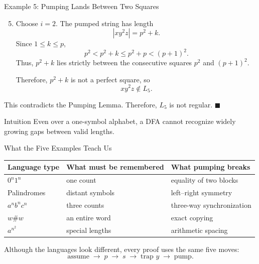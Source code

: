 \documentclass[10pt,aspectratio=169]{beamer}
\begin{document}
\begin{frame}{Example 5: Pumping Lands Between Two Squares}

\small
\begin{enumerate}
    \setcounter{enumi}{4}
    \item Choose $i=2$. The pumped string has length
    \[
    |xy^2z|=p^2+k.
    \]
    Since $1\leq k\leq p$,
    \[
    p^2<p^2+k\leq p^2+p<(p+1)^2.
    \]
    Thus, $p^2+k$ lies strictly between the consecutive squares $p^2$ and $(p+1)^2$.

    Therefore, $p^2+k$ is not a perfect square, so
    \[
    xy^2z\notin L_5.
    \]
\end{enumerate}

This contradicts the Pumping Lemma. Therefore, $L_5$ is not regular.
\hfill $\blacksquare$

\vspace{0.5em}
\begin{block}{Intuition}
Even over a one-symbol alphabet, a DFA cannot recognize widely growing gaps between valid lengths.
\end{block}

\end{frame}

\begin{frame}{What the Five Examples Teach Us}

\small
\begin{center}
\begin{tabular}{lll}
\toprule
\textbf{Language type} & \textbf{What must be remembered} & \textbf{What pumping breaks} \\
\midrule
$0^n1^n$ & one count & equality of two blocks \\
Palindromes & distant symbols & left--right symmetry \\
$a^nb^nc^n$ & three counts & three-way synchronization \\
$w\#w$ & an entire word & exact copying \\
$a^{n^2}$ & special lengths & arithmetic spacing \\
\bottomrule
\end{tabular}
\end{center}

\vspace{0.8em}
Although the languages look different, every proof uses the same five moves:
\[
\text{assume}\;\to\;p\;\to\;s\;\to\;\text{trap }y\;\to\;\text{pump}.
\]

\end{frame}
\end{document}
